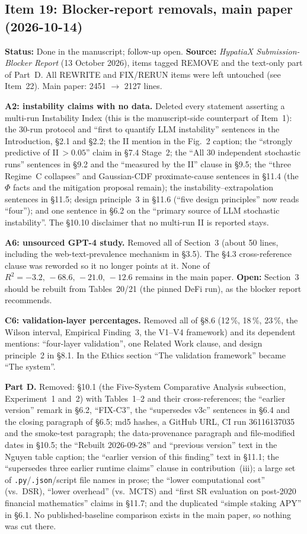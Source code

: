 \documentclass[11pt]{article}
\newcommand{\Rsq}{R^{2}}
\begin{document}
\subsection*{Item 19: Blocker-report removals, main paper (2026-10-14)}
\textbf{Status:} Done in the manuscript; follow-up open. \textbf{Source:} \emph{HypatiaX Submission-Blocker Report} (13 October 2026), items tagged REMOVE
and the text-only part of Part~D. All REWRITE and FIX/RERUN items were left untouched (see Item~22). Main paper: 2451 $\to$ 2127 lines.

\textbf{A2: instability claims with no data.} Deleted every statement asserting a multi-run Instability Index (this is the manuscript-side counterpart of Item~1):
the 30-run protocol and ``first to quantify LLM instability'' sentences in the Introduction, \S2.1 and \S2.2; the II mention in the Fig.~2 caption;
the ``strongly predictive of II\,$>0.05$'' claim in \S7.4 Stage~2; the ``All 30 independent stochastic runs'' sentences in \S9.2 and the ``measured by the II'' clause in \S9.5;
the ``three Regime~C collapses'' and Gaussian-CDF proximate-cause sentences in \S11.4 (the $\Phi$ facts and the mitigation proposal remain); the instability--extrapolation sentences in \S11.5;
design principle~3 in \S11.6 (``five design principles'' now reads ``four''); and one sentence in \S6.2 on the ``primary source of LLM stochastic instability''.
The \S10.10 disclaimer that no multi-run II is reported stays.

\textbf{A6: unsourced GPT-4 study.} Removed all of Section~3 (about 50 lines, including the web-text-prevalence mechanism in \S3.5). The \S4.3 cross-reference clause was reworded so it no longer points at it.
None of $\Rsq=-3.2,\,-68.6,\,-21.0,\,-12.6$ remains in the main paper. \textbf{Open:} Section~3 should be rebuilt from Tables~20/21 (the pinned DeFi run), as the blocker report recommends.

\textbf{C6: validation-layer percentages.} Removed all of \S8.6 (12\,\%, 18\,\%, 23\,\%, the Wilson interval, Empirical Finding~3, the V1--V4 framework) and its dependent mentions:
``four-layer validation'', one Related Work clause, and design principle~2 in \S8.1. In the Ethics section ``The validation framework'' became ``The system''.

\textbf{Part D.} Removed: \S10.1 (the Five-System Comparative Analysis subsection, Experiment~1 and~2) with Tables~1--2 and their cross-references;
the ``earlier version'' remark in \S6.2, ``FIX-C3'', the ``supersedes v3c'' sentences in \S6.4 and the closing paragraph of \S6.5; md5 hashes, a GitHub URL, CI run 36116137035 and the smoke-test paragraph;
the data-provenance paragraph and file-modified dates in \S10.5; the ``Rebuilt 2026-09-28'' and ``previous version'' text in the Nguyen table caption; the ``earlier version of this finding'' text in \S11.1;
the ``supersedes three earlier runtime claims'' clause in contribution~(iii); a large set of \texttt{.py}/\texttt{.json}/script file names in prose; the ``lower computational cost'' (vs.\ DSR), ``lower overhead'' (vs.\ MCTS)
and ``first SR evaluation on post-2020 financial mathematics'' claims in \S11.7; and the duplicated ``simple staking APY'' in \S6.1.
No published-baseline comparison exists in the main paper, so nothing was cut there.
\end{document}
